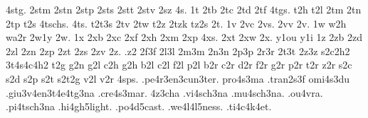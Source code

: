 {    4stg.
    2stm
    2stn
    2stp
    2sts
    2stt
    2stv
    2sz
    4s.
    1t
    2tb
    2tc
    2td
    2tf
    4tgs.
    t2h
    t2l
    2tm
    2tn
    2tp
    t2s
    4tschs.
    4ts.
    t2t3s
    2tv
    2tw
    t2z
    2tzk
    tz2s
    2t.
    1v
    2vc
    2vs.
    2vv
    2v.
    1w
    w2h
    wa2r
    2w1y
    2w.
    1x
    2xb
    2xc
    2xf
    2xh
    2xm
    2xp
    4xs.
    2xt
    2xw
    2x.
    y1ou
    y1i
    1z
    2zb
    2zd
    2zl
    2zn
    2zp
    2zt
    2zs
    2zv
    2z.
    .z2
    2f3f
    2l3l
    2m3m
    2n3n
    2p3p
    2r3r
    2t3t
    2z3z
    s2c2h2
    3t4s4c4h2
    t2g
    g2n
    g2l
    c2h
    g2h
    b2l
    c2l
    f2l
    p2l
    b2r
    c2r
    d2r
    f2r
    g2r
    p2r
    t2r
    z2r
    s2c
    s2d
    s2p
    s2t
    s2t2g
    v2l
    v2r
    4sps.
    .pe4r3en3cun3ter.
    pro4s3ma
    .tran2s3f
    omi4s3du
    .giu3v4en3t4e4tg3na
    .cre4s3mar.
    4z3cha
    .vi4sch3na
    .mu4sch3na.
    .ou4vra.
    .pi4tsch3na
    .hi4gh5light.
    .po4d5cast.
    .we4l4l5ness.
    .ti4c4k4et.    
}                          %

